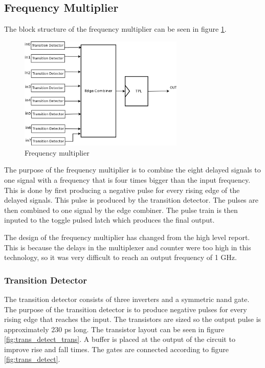 \documentclass[a4paper,12pt]{article} \usepackage{graphicx}
\begin{document}
\subsection{Frequency Multiplier}
The block structure of the frequency multiplier can be seen in figure 
\ref{fig:freq_mult}.
\begin{figure}[p]
        \centering
        \includegraphics[width=0.7\textwidth]{../Bilder/freq_mult_trans.png}
        \caption{Frequency multiplier}
        \label{fig:freq_mult}
\end{figure}

The purpose of the frequency multiplier is to combine the eight delayed signals
to one signal with a frequency that is four times bigger than the input
frequency. This is done by first producing a negative pulse for every rising
edge of the delayed signals. This pulse is produced by the transition detector.
The pulses are then combined to one signal by the edge combiner. The pulse
train is then inputed to the toggle pulsed latch which produces the final output.

The design of the frequency multiplier has changed from the high level report.
This is because the delays in the multiplexer and counter were too high in this
technology, so it was very difficult to reach an output frequency of 1 GHz.

\subsubsection{Transition Detector}
\label{sec:trans_detect}
The transition detector consists of three inverters and a symmetric nand gate.
The purpose of the transition detector is to produce negative pulses for every
rising edge that reaches the input. The transistors are sized so the output
pulse is approximately 230 ps long. The transistor layout can be seen
in figure \ref{fig:trans_detect_trans}.
A buffer is placed at the output of the circuit to improve rise and fall times.
The gates are connected according to figure \ref{fig:trans_detect}.
\end{document}
